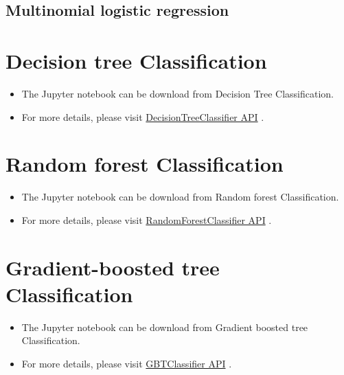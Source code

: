 \documentclass[letterpaper,11pt,english]{sphinxmanual}
\begin{document}
\subsection{Multinomial logistic regression}
\label{classification:multinomial-logistic-regression}

\section{Decision tree Classification}
\label{classification:decision-tree-classification}\begin{itemize}
\item {} 
The Jupyter notebook can be download from Decision Tree Classification.

\item {} 
For more details, please visit \href{http://takwatanabe.me/pyspark/generated/generated/ml.classification.DecisionTreeClassifier.html}{DecisionTreeClassifier API} .

\end{itemize}


\section{Random forest Classification}
\label{classification:random-forest-classification}\begin{itemize}
\item {} 
The Jupyter notebook can be download from Random forest Classification.

\item {} 
For more details, please visit \href{http://takwatanabe.me/pyspark/generated/generated/ml.classification.RandomForestClassifier.html}{RandomForestClassifier API} .

\end{itemize}


\section{Gradient-boosted tree Classification}
\label{classification:gradient-boosted-tree-classification}\begin{itemize}
\item {} 
The Jupyter notebook can be download from Gradient boosted tree Classification.

\item {} 
For more details, please visit \href{http://takwatanabe.me/pyspark/generated/generated/ml.classification.GBTClassifier.html}{GBTClassifier API} .

\end{itemize}
\end{document}
